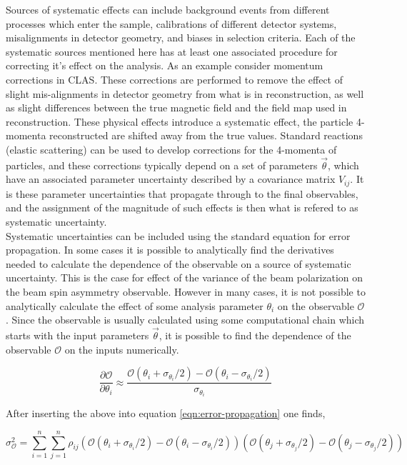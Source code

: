 Sources of systematic effects can include background events from different processes which enter the sample, calibrations of different detector systems, misalignments in detector geometry, and biases in selection criteria.  Each of the systematic sources mentioned here has at least one associated procedure for correcting it's effect on the analysis.  As an example consider momentum corrections in CLAS.  These corrections are performed to remove the effect of slight mis-alignments in detector geometry from what is in reconstruction, as well as slight differences between the true magnetic field and the field map used in reconstruction.  These physical effects introduce a systematic effect, the particle 4-momenta reconstructed are shifted away from the true values.  Standard reactions (elastic scattering) can be used to develop corrections for the 4-momenta of particles, and these corrections typically depend on a set of parameters $\vec{\theta}$, which have an associated parameter uncertainty described by a covariance matrix $V_{ij}$.  It is these parameter uncertainties that propagate through to the final observables, and the assignment of the magnitude of such effects is then what is refered to as systematic uncertainty. \\

Systematic uncertainties can be included using the standard equation for error propagation.  In some cases it is possible to analytically find the derivatives needed to calculate the dependence of the observable on a source of systematic uncertainty.  This is the case for effect of the variance of the beam polarization on the beam spin asymmetry observable.  However in many cases, it is not possible to analytically calculate the effect of some analysis parameter $\theta_i$ on the observable $\mathcal{O}$.  Since the observable is usually calculated using some computational chain which starts with the input parameters $\vec{\theta}$, it is possible to find the dependence of the observable $\mathcal{O}$ on the inputs numerically.

\begin{equation}
  \frac{\partial \mathcal{O}}{ \partial \theta_i} \approx \frac{\mathcal{O}(\theta_i + \sigma_{\theta_i}/2) - \mathcal{O}(\theta_i - \sigma_{\theta_i}/2)}{\sigma_{\theta_i}}
\end{equation}

After inserting the above into equation \ref{eqn:error-propagation} one finds,

\begin{equation}
  \sigma_{\mathcal{O}}^{2} = \sum_{i=1}^{n} \sum_{j=1}^{n} \rho_{ij} (\mathcal{O}(\theta_i + \sigma_{\theta_i}/2) - \mathcal{O}(\theta_i - \sigma_{\theta_i}/2)) (\mathcal{O}(\theta_j + \sigma_{\theta_j}/2) - \mathcal{O}(\theta_j - \sigma_{\theta_j}/2)) 
\end{equation}

